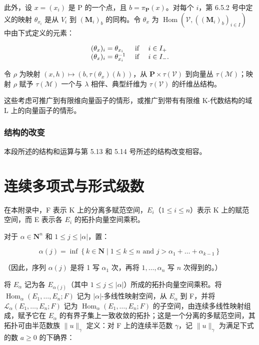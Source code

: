 此外，设 \(x = (x_i)\) 是 P 的一个点，且 \(b = \pi_{\mathbf{P}}(x)\)。对每个 \(i\)，第 6.5.2 号中定义的映射 \(\theta_{x_i}\) 是从 \(V_i\) 到 \((\mathbf{M}_i)_b\) 的同构。令 \(\theta_x\) 为 \(\operatorname{Hom}(\mathcal{V}, ((\mathbf{M}_i)_b)_{i \in I})\) 中由下式定义的元素：

\[
\begin{array}{l l} (\theta_ {x}) _ {i} = \theta_ {x _ {i}} & \text { if } \quad i \in I _ {+} \\ (\theta_ {x}) _ {i} = \theta_ {x _ {i}} ^ {- 1} & \text { if } \quad i \in I _ {-}. \end{array}
\]

令 \(\rho\) 为映射 \((x, h) \mapsto (b, \tau(\theta_x)(h))\)，从 \(\mathbf{P} \times \tau(\mathcal{V})\) 到向量丛 \(\tau(\mathcal{M})\)；映射 \(\rho\) 赋予 \(\tau(\mathcal{M})\) 一个与 \(\lambda\) 相伴、典型纤维为 \(\tau(\mathcal{V})\) 的纤维丛结构。

这些考虑可推广到有限维向量函子的情形，或推广到带有有限维 K-代数结构的域 L 上的向量函子的情形。

\subsection{结构的改变}

本段所述的结构和运算与第 5.13 和 5.14 号所述的结构改变相容。

\appendix

\chapter{连续多项式与形式级数}

在本附录中，F 表示 K 上的分离多赋范空间，\(E_{i}\)（\(1 \leqslant i \leqslant n\)）表示 K 上的赋范空间，而 E 表示各 \(E_{i}\) 的拓扑向量空间乘积。

对于 \(\alpha \in \mathbf{N}^n\) 和 \(1 \leqslant j \leqslant |\alpha|\)，置：

\[
\alpha (j) = \inf \left\{k \in \mathbf {N} \mid 1 \leqslant k \leqslant n \text { and } j > \alpha_ {1} + \dots + \alpha_ {k - 1} \right\}
\]

（因此，序列 \(\alpha(j)\) 是将 1 写 \(\alpha_{1}\) 次，再将 \(1,\ldots,\alpha_{n}\) 写 \(n\) 次得到的。）

将 \(E_{\alpha}\) 记为各 \(E_{\alpha(j)}\)（其中 \(1 \leqslant j \leqslant |\alpha| \)）所成的拓扑向量空间乘积。将 \(\operatorname{Hom}_{\alpha}(E_1, \ldots, E_n; F)\) 记为 \(|\alpha|\)-多线性映射空间，从 \(E_{\alpha}\) 到 F，并将 \(\mathcal{L}_{\alpha}(E_1, \ldots, E_n; F)\) 记为 \(\operatorname{Hom}_{\alpha}(E_1, \ldots, E_n; F)\) 的子空间，由连续多线性映射组成，赋予它在 \(E_{\alpha}\) 的有界子集上一致收敛的拓扑；这是一个分离的多赋范空间，其拓扑可由半范数族 \(\| u \|_{\gamma}\) 定义：对 F 上的连续半范数 \(\gamma\)，记 \(\| u \|_{\gamma}\) 为满足下式的数 \(a \geqslant 0\) 的下确界：

